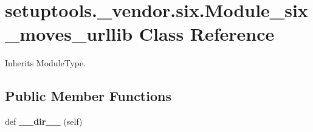 \hypertarget{classsetuptools_1_1__vendor_1_1six_1_1_module__six__moves__urllib}{}\section{setuptools.\+\_\+vendor.\+six.\+Module\+\_\+six\+\_\+moves\+\_\+urllib Class Reference}
\label{classsetuptools_1_1__vendor_1_1six_1_1_module__six__moves__urllib}


Inherits Module\+Type.

\subsection*{Public Member Functions}
\begin{DoxyCompactItemize}
\item 
\mbox{\label{classsetuptools_1_1__vendor_1_1six_1_1_module__six__moves__urllib_ae132e8418402b97f011edc6bc98cdd9f}} 
def {\bfseries \+\_\+\+\_\+dir\+\_\+\+\_\+} (self)
\end{DoxyCompactItemize}
